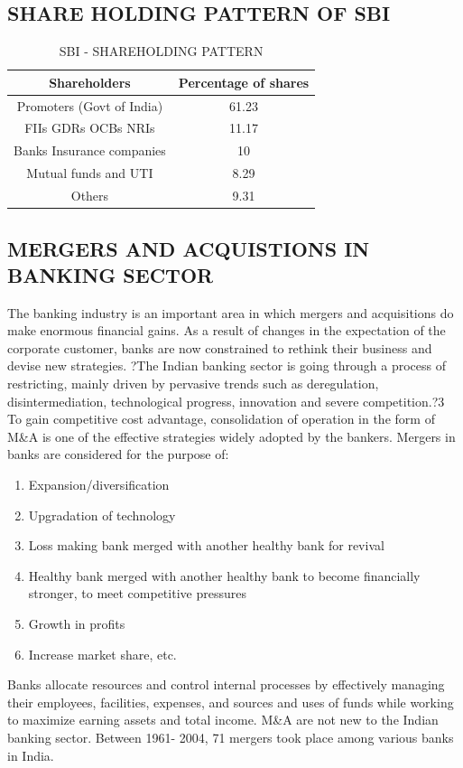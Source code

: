 \documentclass[a4paper, 12pt]{extarticle}
\begin{document}
{\subsection{SHARE HOLDING PATTERN OF SBI}
\begin{table}[H]
\centering
\begin{tabular}{|c|c|}
\hline
Shareholders & Percentage of shares \\
\hline
Promoters (Govt of India) & 61.23 \\
\hline
FIIs GDRs OCBs NRIs & 11.17 \\
\hline
Banks Insurance companies & 10\\
\hline
Mutual funds and UTI & 8.29\\
\hline
Others & 9.31 \\
\hline
\end{tabular}
\caption{SBI - SHAREHOLDING PATTERN}
\end{table}

\subsection{MERGERS AND ACQUISTIONS IN BANKING SECTOR}
The banking industry is an important area in which mergers and acquisitions do make enormous financial gains. As a result of changes in the expectation of the corporate customer, banks are now constrained to rethink their business and devise new strategies. ?The Indian banking sector is going through a process of restricting, mainly driven by pervasive trends such as deregulation, disintermediation, technological progress, innovation and severe competition.?3 To gain competitive cost advantage, consolidation of operation in the form of M\&A is one of the effective strategies widely adopted by the bankers. Mergers in banks are considered for the purpose of:
\begin{enumerate}
\item Expansion/diversification
\item Upgradation of technology
\item Loss making bank merged with another healthy bank for revival
\item Healthy bank merged with another healthy bank to become financially
stronger, to meet competitive pressures
\item Growth in profits
\item Increase market share, etc.
\end{enumerate}
Banks allocate resources and control internal processes by effectively
managing their employees, facilities, expenses, and sources and uses of funds while working to maximize earning assets and total income. M\&A are not new to the Indian banking sector. Between 1961- 2004, 71 mergers took place among various banks in India.
}
\end{document}
